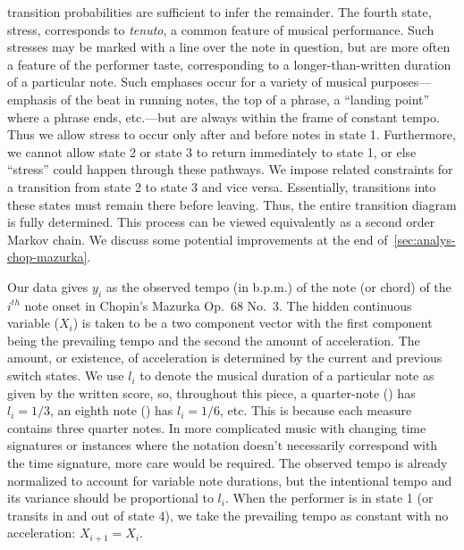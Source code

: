 \documentclass[12pt]{article}
\begin{document}
transition probabilities are sufficient to infer the remainder. The fourth
state, stress, corresponds to {\em tenuto}, a common feature of
musical performance. Such stresses may be marked with a line over the
note in question, but are more often a feature of the performer taste,
corresponding to a longer-than-written duration of a particular
note. Such emphases occur for a variety of musical purposes---emphasis
of the beat in running notes, the top of a
phrase, a ``landing point'' where a phrase ends, etc.---but are always
within the frame of constant tempo. Thus we allow stress to occur only
after and before notes in state 1. Furthermore, we cannot allow
state 2 or state 3 to return immediately to state 1, or else ``stress'' could
happen through these pathways. We impose related constraints for a transition from state 2
to state 3 and vice versa. Essentially, transitions into these states must remain
there before leaving. Thus, the entire transition diagram is
fully determined. This process can  be viewed equivalently as a second
order Markov chain. We discuss some potential improvements at the end
of~\autoref{sec:analys-chop-mazurka}. 


Our data gives $y_i$ as the observed tempo (in b.p.m.) of the note (or
chord) of the $i^{th}$ note onset in Chopin's Mazurka Op.\ 68 No.\ 3. The
hidden continuous variable ($X_i$) is 
taken to be a two component vector with the first component being the
prevailing tempo and the second the amount of acceleration. The amount, or
existence, of acceleration is determined by the current and previous
switch states. We use $l_i$ to denote the musical duration of
a particular note as given by the written score, so, throughout this piece, a quarter-note (\quarternote) has $l_i=1/3$, an
eighth note (\eighthnote) has $l_i=1/6$, etc. This is because each
measure contains three quarter notes. In more complicated
music with changing time signatures or instances where the notation
doesn't necessarily correspond with the time signature, more care
would be required. The observed tempo is already normalized to account
for variable note durations, but the intentional tempo and its
variance should be proportional to $l_i$. When the performer is in state 1 (or
transits in and out of state 4), we take the prevailing tempo as
constant with no acceleration: $X_{i+1} = X_i$. 
\end{document}
